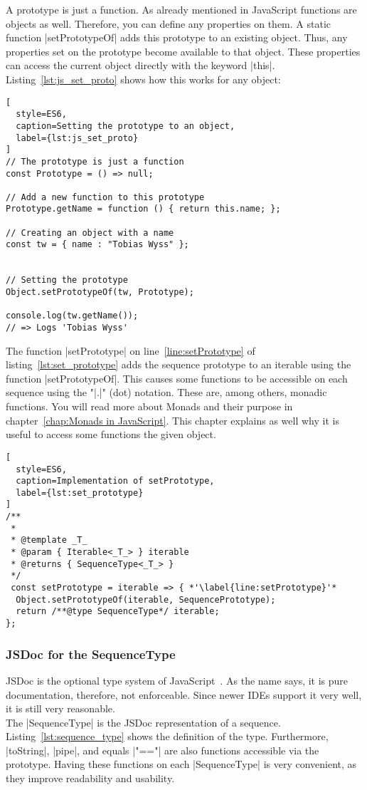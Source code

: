 A prototype is just a function. As already mentioned in JavaScript functions
are objects as well. Therefore, you can define any properties on them. A static
function |setPrototypeOf| adds this prototype to an existing object. Thus, any
properties set on the prototype become available to that object. These
properties can access the current object directly with the keyword |this|.
Listing~\ref{lst:js_set_proto} shows how this works for any object:

\begin{lstlisting}[
  style=ES6,
  caption=Setting the prototype to an object,
  label={lst:js_set_proto}
]
// The prototype is just a function
const Prototype = () => null; 

// Add a new function to this prototype
Prototype.getName = function () { return this.name; };

// Creating an object with a name
const tw = { name : "Tobias Wyss" };


// Setting the prototype
Object.setPrototypeOf(tw, Prototype);

console.log(tw.getName());
// => Logs 'Tobias Wyss' 
\end{lstlisting}


The function |setPrototype| on line~\ref{line:setPrototype} of
listing~\ref{lst:set_prototype} adds the sequence prototype to an iterable
using the function |setPrototypeOf|. This causes some functions to be
accessible on each sequence using the "|.|" (dot) notation. These are, among
others, monadic functions. You will read more about Monads and their purpose in
chapter~\ref{chap:Monads in JavaScript}. This chapter explains as well why it
is useful to access some functions the given object.
\begin{lstlisting}[
  style=ES6,
  caption=Implementation of setPrototype,
  label={lst:set_prototype}
]
/**
 *
 * @template _T_
 * @param { Iterable<_T_> } iterable
 * @returns { SequenceType<_T_> }
 */
 const setPrototype = iterable => { *'\label{line:setPrototype}'*
  Object.setPrototypeOf(iterable, SequencePrototype);
  return /**@type SequenceType*/ iterable;
};
\end{lstlisting}

\subsubsection{JSDoc for the SequenceType} %
\label{subsub:The SequenceType}
JSDoc is the optional type system of JavaScript~\cite{jsdoc_use_2023}. As the
name says, it is pure documentation, therefore, not enforceable. Since newer
IDEs support it very well, it is still very reasonable.\\
The |SequenceType| is the JSDoc representation of a sequence.
Listing~\ref{lst:sequence_type} shows the definition of the type. Furthermore,
|toString|, |pipe|, and equals |"=="| are also functions accessible via the
prototype. Having these functions on each |SequenceType| is very convenient,
as they improve readability and usability.

